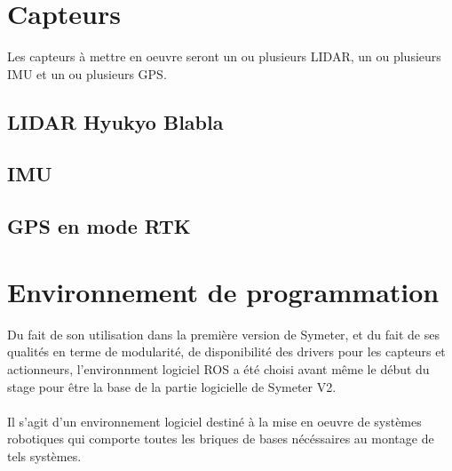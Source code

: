 \documentclass[12pt,a4paper]{report}
\begin{document}
	\section{Capteurs}
		Les capteurs à mettre en oeuvre seront un ou plusieurs LIDAR, un ou plusieurs IMU et un ou plusieurs GPS.
		\subsection{LIDAR Hyukyo Blabla}
		
		\subsection{IMU}
		
		\subsection{GPS en mode RTK}
		
		
		
		
	\section{Environnement de programmation}
	Du fait de son utilisation dans la première version de Symeter, et du fait de ses qualités en terme de modularité, de disponibilité des drivers pour les capteurs et actionneurs, l'environnment logiciel ROS a été choisi avant même le début du stage pour être la base de la partie logicielle de Symeter V2.
		
	\paragraph*{} Il s'agit d'un environnement logiciel destiné à la mise en oeuvre de systèmes robotiques qui comporte toutes les briques de bases nécéssaires au montage de tels systèmes.
		
\end{document}
